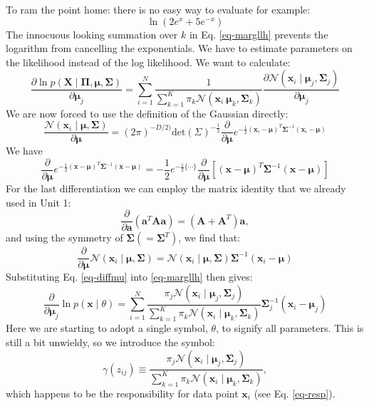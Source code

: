 To ram the point home: there is no easy way to evaluate for example:
$$
\ln (2e^x + 5e^{-x})
$$
The innocuous looking summation over $k$ in Eq. \ref{eq-margllh} prevents the logarithm from cancelling the exponentials. We have to estimate parameters on the likelihood
instead of the log likelihood. We want to calculate:
$$
\frac{\partial \ln p(\boldsymbol{X} \mid \boldsymbol{\Pi}, \boldsymbol{\mu}, \boldsymbol{\Sigma})}{\partial \boldsymbol{\mu}_j} =
\sum^N_{i=1} \frac{1}{\sum^K_{k=1} \pi_k \mathcal{N}(\boldsymbol{x}_i \ \boldsymbol{\mu}_k, \boldsymbol{\Sigma}_k)}\frac{\partial \mathcal{N}(\boldsymbol{x}_i \mid \boldsymbol{\mu}_j, \boldsymbol{\Sigma}_j)}{\partial \boldsymbol{\mu}_j}
$$
We are now forced to use the definition of the Gaussian directly:
$$
\frac{\mathcal{N}(\boldsymbol{x}_i \mid \boldsymbol{\mu}, \boldsymbol{\Sigma}) }{ \partial \boldsymbol{\mu}} = (2 \pi)^{-D/2)} \mbox{det}(\Sigma)^{-\frac{1}{2}} \frac{\partial}{\partial \boldsymbol{\mu}} e^{-\frac{1}{2}(\boldsymbol{x}_i - \boldsymbol{\mu})^T \boldsymbol{\Sigma}^{-1} (\boldsymbol{x}_i - \boldsymbol{\mu})}
$$
We have
$$
\frac{\partial}{\partial \boldsymbol{\mu}} e^{-\frac{1}{2}(\boldsymbol{x} - \boldsymbol{\mu})^T \boldsymbol{\Sigma}^{-1}(\boldsymbol{x} - \boldsymbol{\mu})} =
 -\frac{1}{2} e^{-\frac{1}{2}\{\cdots \}}\frac{\partial}{\partial \boldsymbol{\mu}} [ (\boldsymbol{x} - \boldsymbol{\mu})^T \boldsymbol{\Sigma}^{-1} (\boldsymbol{x} - \boldsymbol{\mu}) ]
 $$
 For the last differentiation we can employ the matrix identity that we already used in Unit 1:
 $$
 \frac{\partial}{\partial \boldsymbol{a} } (\boldsymbol{a}^T \boldsymbol{A} \boldsymbol{a}) = (\boldsymbol{A} + \boldsymbol{A}^T)\boldsymbol{a},
 $$
 and using the symmetry of $\boldsymbol{\Sigma} (= \boldsymbol{\Sigma}^T)$, we find that:
 \begin{equation}
   \frac{\partial}{\partial \boldsymbol{\mu} } \mathcal{N}(\boldsymbol{x}_i \mid \boldsymbol{\mu}, \boldsymbol{\Sigma} ) = \mathcal{N}(\boldsymbol{x}_i \mid \boldsymbol{\mu}, \boldsymbol{\Sigma} ) \boldsymbol{\Sigma}^{-1}( \boldsymbol{x}_i - \boldsymbol{\mu})
   \label{eq-diffmu}
 \end{equation}
 Substituting Eq. \ref{eq-diffmu} into \ref{eq-margllh} then gives:
 $$
 \frac{\partial}{\partial \boldsymbol{\mu}_j} \ln p(\boldsymbol{x} \mid \theta) = \sum^N_{i=1} \frac{\pi_j \mathcal{N}(\boldsymbol{x}_i \mid \boldsymbol{\mu}_j, \boldsymbol{\Sigma}_j )}{ \sum^K_{k=1} \pi_k \mathcal{N}(\boldsymbol{x}_i \mid \boldsymbol{\mu}_k, \boldsymbol{\Sigma}_k)} \boldsymbol{\Sigma}^{-1}_j(\boldsymbol{x}_i - \boldsymbol{\mu}_j)
 $$
 Here we are starting to adopt a single symbol, $\theta$, to signify all parameters. This is still a bit unwieldy, so we  introduce
 the symbol:
 \begin{equation}
   \gamma(z_{ij}) \equiv  \frac{\pi_j \mathcal{N}(\boldsymbol{x}_i \mid \boldsymbol{\mu}_j, \boldsymbol{\Sigma}_j) }{\sum^K_{k=1} \pi_k \mathcal{N}(\boldsymbol{x}_i \mid \boldsymbol{\mu}_k, \boldsymbol{\Sigma}_k )},
 \end{equation}
 which happens to be the responsibility for data point $\boldsymbol{x}_i$ (see Eq. \ref{eq-resp}).

